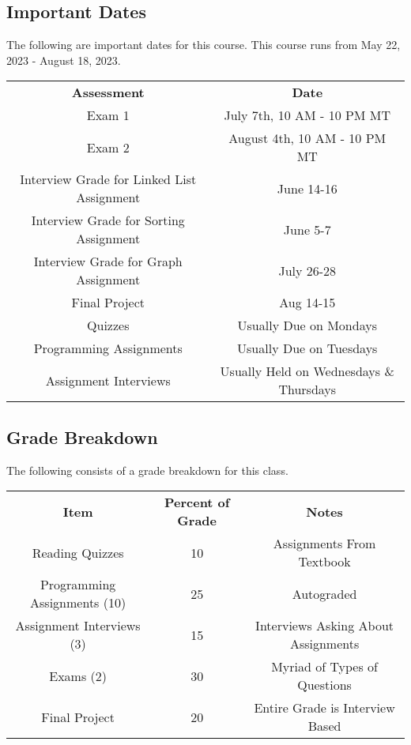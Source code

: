 \subsection{Important Dates}
The following are important dates for this course. This course runs from May 22, 2023 - August 18, 2023.
\begin{table}[ht]
    \centering
    \begin{tabular}{c c}
        \textbf{Assessment} & \textbf{Date} \\
        Exam 1 & July 7th, 10 AM - 10 PM MT \\
        Exam 2 & August 4th, 10 AM - 10 PM MT \\
        Interview Grade for Linked List Assignment & June 14-16 \\
        Interview Grade for Sorting Assignment & June 5-7 \\
        Interview Grade for Graph Assignment & July 26-28 \\
        Final Project & Aug 14-15 \\
        Quizzes & Usually Due on Mondays \\
        Programming Assignments & Usually Due on Tuesdays \\
        Assignment Interviews & Usually Held on Wednesdays \& Thursdays \\
    \end{tabular}
\end{table}
\par \noindent

\subsection{Grade Breakdown}
The following consists of a grade breakdown for this class.
\begin{table}[ht]
    \centering
    \begin{tabular}{c c c}
        \textbf{Item} & \textbf{Percent of Grade} & \textbf{Notes} \\
        Reading Quizzes & 10 & Assignments From Textbook \\
        Programming Assignments (10) & 25 & Autograded \\
        Assignment Interviews (3) & 15 & Interviews Asking About Assignments \\
        Exams (2) & 30 & Myriad of Types of Questions \\
        Final Project & 20 & Entire Grade is Interview Based \\
    \end{tabular}
\end{table}
\par \noindent

